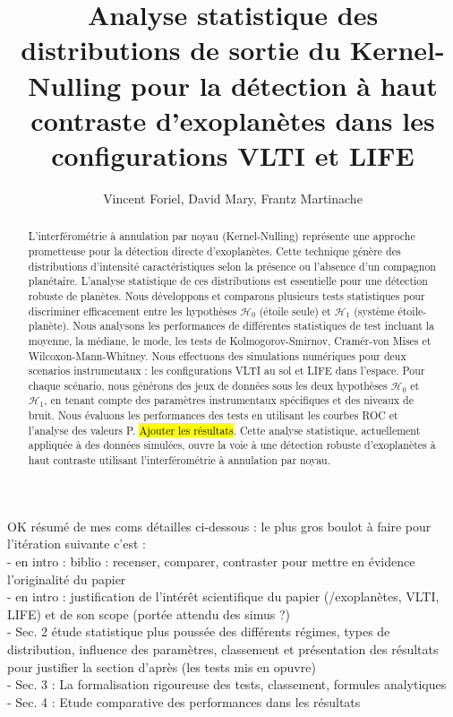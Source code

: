\documentclass{article}
\title{Analyse statistique des distributions de sortie du Kernel-Nulling pour la détection à haut contraste d'exoplanètes dans les configurations VLTI et LIFE}
\author{Vincent Foriel,
        David Mary,
        Frantz Martinache
       }
\newcommand{\dm}[1]{{\color{mulberry} #1}}
\begin{document}
\maketitle

\begin{abstract}
L'interférométrie à annulation par noyau (Kernel-Nulling) représente une approche prometteuse pour la détection directe d'exoplanètes. Cette technique génère des distributions d'intensité caractéristiques selon la présence ou l'absence d'un compagnon planétaire. L'analyse statistique de ces distributions est essentielle pour une détection robuste de planètes. Nous développons et comparons plusieurs tests statistiques pour discriminer efficacement entre les hypothèses $\mathcal{H}_0$ (étoile seule) et $\mathcal{H}_1$ (système étoile-planète). Nous analysons les performances de différentes statistiques de test incluant la moyenne, la médiane, le mode, les tests de Kolmogorov-Smirnov, Cramér-von Mises et Wilcoxon-Mann-Whitney. Nous effectuons des simulations numériques pour deux scenarios instrumentaux : les configurations VLTI au sol et LIFE dans l'espace. Pour chaque scénario, nous générons des jeux de données sous les deux hypothèses $\mathcal{H}_0$ et $\mathcal{H}_1$, en tenant compte des paramètres instrumentaux spécifiques et des niveaux de bruit. Nous évaluons les performances des tests en utilisant les courbes ROC et l'analyse des valeurs P. \hl{Ajouter les résultats}. Cette analyse statistique, actuellement appliquée à des données simulées, ouvre la voie à une détection robuste d'exoplanètes à haut contraste utilisant l'interférométrie à annulation par noyau.
\end{abstract}


\dm{OK résumé de mes coms détailles ci-dessous : le plus gros boulot à faire pour l'itération suivante c'est : \\
- en intro : biblio : recenser, comparer, contraster pour mettre en évidence l'originalité du papier\\
- en intro : justification de l'intérêt scientifique du papier (/exoplanètes, VLTI, LIFE) et de son scope (portée attendu des simus ?) \\
- Sec. 2 étude statistique plus poussée des différents régimes, types de distribution, influence des paramètres, classement et présentation des résultats pour justifier la section d'après (les tests mis en opuvre)\\
- Sec. 3 : La formalisation rigoureuse des tests, classement, formules analytiques \\
- Sec. 4 : Etude comparative des performances dans les résultats }
\end{document}
